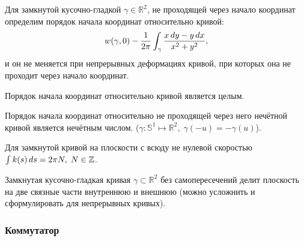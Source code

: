 \begin{to_tas}
Для замкнутой кусочно-гладкой $\gamma \in \mathbb{R}^2$, не проходящей через начало координат определим порядок начала координат относительно кривой:
\begin{equation*}
    w (\gamma, 0) - \frac{1}{2 \pi} \int_{\gamma} \frac{x \, d y - y \, d x}{x^2 + y^2},
\end{equation*}
и он не меняется при непрерывных деформациях кривой, при которых она не проходит через начало координат.
\end{to_tas}

\begin{to_tas}
    Порядок начала координат относительно кривой является целым.
\end{to_tas}

\begin{to_tas}
    Порядок начала координат относительно не проходящей через него нечётной кривой является нечётным числом. ($\gamma \colon \mathbb{S}^1 \mapsto \mathbb{R}^2, \; \gamma(-u) = - \gamma(u)$).
\end{to_tas}

\begin{to_tas}
    Для замкнутой кривой на плоскости с всюду не нулевой скоростью $\int k(s) \, d s = 2 \pi N, \; N \in \mathbb{Z}$.
\end{to_tas}

\begin{to_tas}
    Замкнутая кусочно-гладкая кривая $\gamma \subset \mathbb{R}^2$ без самопересечений делит плоскость на две связные части внутреннюю и внешнюю (можно усложнить и сформулировать для непрерывных кривых).
\end{to_tas}



\subsubsection*{Коммутатор}

